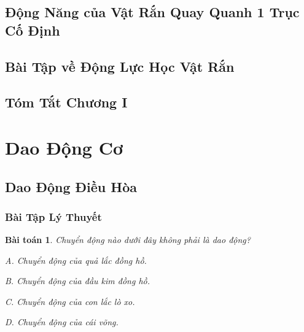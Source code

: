 \documentclass{article}
\numberwithin{equation}{section}
\newtheorem{baitoan}{Bài toán}[section]
\begin{document}

\subsection{Động Năng của Vật Rắn Quay Quanh 1 Trục Cố Định}


\subsection{Bài Tập về Động Lực Học Vật Rắn}


\subsection{Tóm Tắt Chương I}


\newpage
\section{Dao Động Cơ}

\subsection{Dao Động Điều Hòa}

\subsubsection{Bài Tập Lý Thuyết}

\begin{baitoan}
	Chuyển động nào dưới đây không phải là dao động?
	\begin{enumerate*}
		\item[{\rm\sf A.}] Chuyển động của quả lắc đồng hồ.
		\item[{\rm\sf B.}] Chuyển động của đầu kim đồng hồ.
		\item[{\rm\sf C.}] Chuyển động của con lắc lò xo.
		\item[{\rm\sf D.}] Chuyển động của cái võng.
	\end{enumerate*}
\end{baitoan}
\end{document}
